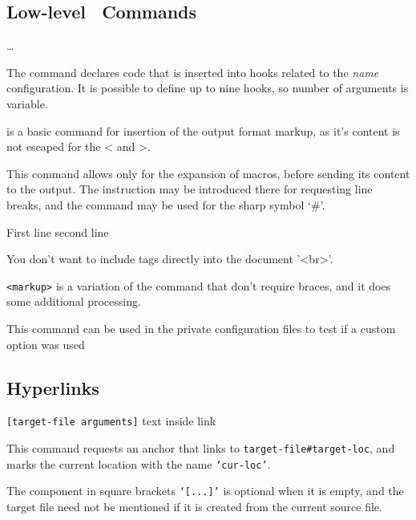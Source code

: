 \subsection{Low-level \texfourht\ Commands}

\ldots{}

The  command declares code that is inserted into hooks related to the \textit{name} configuration.
It is possible to define up to nine hooks, so number of arguments is variable.




 is a basic command for insertion
of the output format markup, as it's content is not escaped for the \textless{}
and \textgreater.

This command allows only for the expansion of macros, before sending its content to the output. 
The instruction \texcommand{\Hnewline} may be introduced there for requesting line breaks, and the command \texcommand{\#} may be used for the sharp symbol ‘\#’.

\begin{texsource}
First line
second line 

You don't want to include tags directly into the document '<br>'. 
\end{texsource}

\verb|<markup>| is a variation of the  command that don't require braces, and it does some additional processing.


This command can be used in the private configuration files to test if a custom option was used

\subsection{Hyperlinks}

\texttt{[target-file arguments]} text inside link

This command requests an anchor that links to \verb|target-file#target-loc|, and marks the current location with the name \verb|‘cur-loc’|.

The component in square brackets \texttt{‘[...]’} is optional when it is empty, 
and the target file need not be mentioned if it is created from the current source file.



